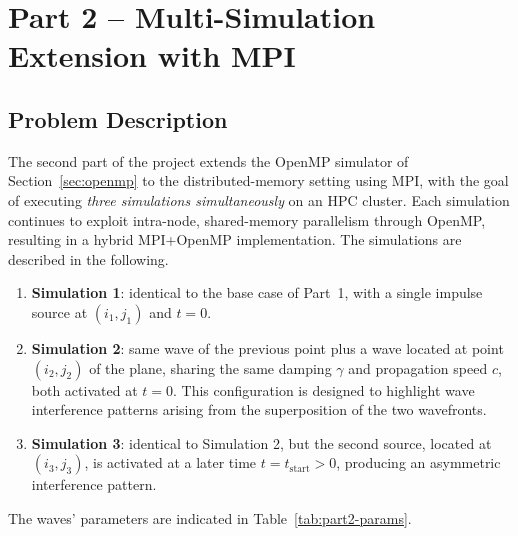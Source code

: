\section{Part 2 -- Multi-Simulation Extension with MPI}
\label{sec:mpi}

\subsection{Problem Description}
The second part of the project extends the OpenMP simulator of
Section~\ref{sec:openmp} to
the distributed-memory setting using MPI, with the goal of executing
\emph{three
simulations simultaneously} on an HPC cluster. Each simulation
continues to exploit
intra-node, shared-memory parallelism through OpenMP, resulting in a
hybrid MPI+OpenMP
implementation. The simulations are described in the following.

\begin{enumerate}[label=(\roman*)]
  \item \textbf{Simulation 1}: identical to the base case of Part~1,
    with a single impulse
    source at $(i_1,j_1)$ and $t=0$.
  \item \textbf{Simulation 2}: same wave of the previous point plus
    a wave located at point $(i_2, j_2)$
    of the plane, sharing the same damping $\gamma$ and propagation
    speed $c$, both activated
    at $t=0$. This configuration is designed to highlight wave
    interference patterns arising
    from the superposition of the two wavefronts.
  \item \textbf{Simulation 3}: identical to Simulation 2, but the
    second source, located at $(i_3, j_3)$, is activated
    at a later time $t = t_{\text{start}} > 0$, producing an
    asymmetric interference pattern.
\end{enumerate}

The waves' parameters are indicated in Table~\ref{tab:part2-params}.

